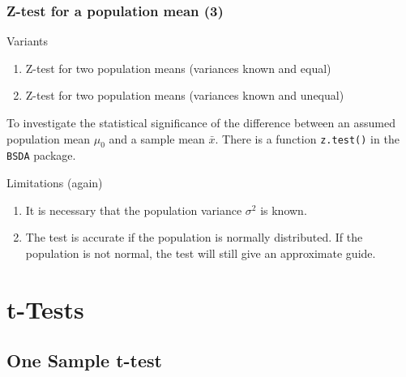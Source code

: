 \documentclass[xcolor={table}]{beamer}
\begin{document}
\begin{frame}\frametitle{Z-test for a population mean (3)} 
  \begin{block}{Variants}
    \begin{enumerate}
      \item Z-test for two population means (variances known and equal)
      \item Z-test for two population means (variances known and unequal)
    \end{enumerate}
    To investigate the statistical significance of the difference between an assumed population mean $\mu_0$ and a sample mean $\bar{x}$. There is a function \texttt{z.test()} in the \texttt{BSDA} package.
  \end{block}
  \begin{alertblock}{Limitations (again)}
    \begin{enumerate}
      \item It is necessary that the population variance $\sigma^2$ is known. 
      \item The test is accurate if the population is normally distributed. If the population is not normal, the test will still give an approximate guide.
    \end{enumerate}
  \end{alertblock}
\end{frame}

\section{t-Tests}
\subsection{One Sample t-test}


\end{document}
